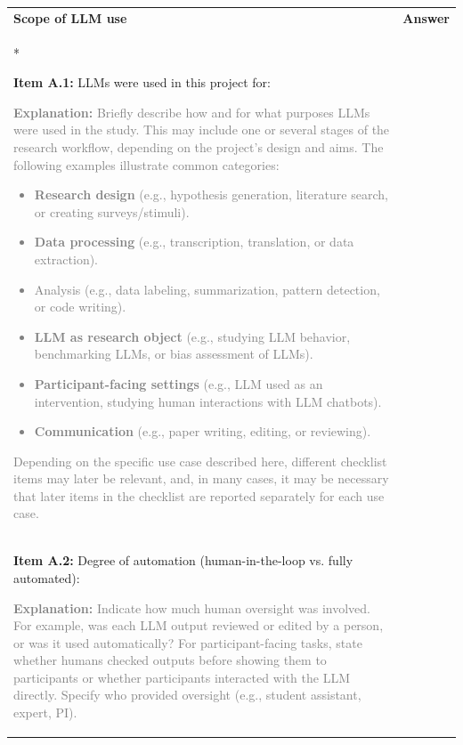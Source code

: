 \documentclass[12pt]{article}
\begin{document}
\begin{longtable}{|p{}|p{}|}
\hline
\rowcolor{green!20}
\textbf{Scope of LLM use} & \textbf{Answer} \\*   %
\hline

\textbf{Item A.1:} LLMs were used in this project for:

\textcolor{gray}{{\footnotesize
\textbf{Explanation:} Briefly describe how and for what purposes LLMs were used in the study. This may include one or several stages of the research workflow, depending on the project’s design and aims. The following examples illustrate common categories:
\begin{itemize}[leftmargin=*]\setlength{\itemsep}{0pt}\setlength{\parskip}{0pt}
    \item \textbf{Research design} (e.g., hypothesis generation, literature search, or creating surveys/stimuli).
    \item \textbf{Data processing} (e.g., transcription, translation, or data extraction).
    \item Analysis (e.g., data labeling, summarization, pattern detection, or code writing).
    \item \textbf{LLM as research object} (e.g., studying LLM behavior, benchmarking LLMs, or bias assessment of LLMs).
    \item \textbf{Participant-facing settings} (e.g., LLM used as an intervention, studying human interactions with LLM chatbots).
    \item \textbf{Communication} (e.g., paper writing, editing, or reviewing).
\end{itemize}
Depending on the specific use case described here, different checklist items may later be relevant, and, in many cases, it may be necessary that later items in the checklist are reported separately for each use case.}}
&   \\
\hline
\textbf{Item A.2:} Degree of automation (human-in-the-loop vs. fully automated):

\textcolor{gray}{{\footnotesize
\textbf{Explanation:} Indicate how much human oversight was involved. For example, was each LLM output reviewed or edited by a person, or was it used automatically? For participant-facing tasks, state whether humans checked outputs before showing them to participants or whether participants interacted with the LLM directly. Specify who provided oversight (e.g., student assistant, expert, PI).}}  &   \\
\hline
\end{longtable}
\end{document}
